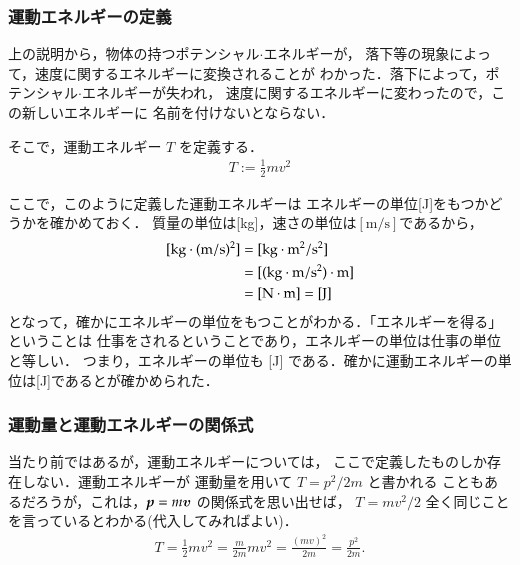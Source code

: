             \subsubsection{運動エネルギーの定義}
                上の説明から，物体の持つポテンシャル$\cdot$エネルギーが，
                落下等の現象によって，速度に関するエネルギーに変換されることが
                わかった．落下によって，ポテンシャル$\cdot$エネルギーが失われ，
                速度に関するエネルギーに変わったので，この新しいエネルギーに
                名前を付けないとならない．

                そこで，運動エネルギー $T$ を定義する．
                    \begin{align}
                        T :=  \frac{1}{2} m {\textit{v}^{2}}
                    \end{align}

                ここで，このように定義した運動エネルギーは
                エネルギーの単位[J]をもつかどうかを確かめておく．
                質量の単位は[kg]，速さの単位は$\mathrm{[m/s]}$であるから，
                    \begin{align}
                        \mathrm{ [kg\cdot (m/s)^{2}]} &= \mathrm{[kg\cdot m^{2}/s^{2}]      } \notag \\
                                                      &= \mathrm{[(kg\cdot m/s^{2})\cdot m] } \notag \\
                                                      &= \mathrm{[N\cdot m]=[J]             }
                    \end{align}
                となって，確かにエネルギーの単位をもつことがわかる．「エネルギーを得る」ということは
                仕事をされるということであり，エネルギーの単位は仕事の単位と等しい．
                つまり，エネルギーの単位も [J] である．確かに運動エネルギーの単位は[J]であるとが確かめられた．

            \subsubsection{運動量と運動エネルギーの関係式}
                当たり前ではあるが，運動エネルギーについては，
                ここで定義したものしか存在しない．運動エネルギーが
                運動量を用いて $T=p^{2}/2m$ と書かれる
                こともあるだろうが，これは，$\textit{\textbf{p}}=m\boldsymbol{v}$ の関係式を思い出せば，
                $T=mv^{2}/2$ 全く同じことを言っているとわかる(代入してみればよい)．
                    \begin{align}
                        T=\frac{1}{2}mv^{2}=\frac{m}{2m}mv^{2}=\frac{(mv)^{2}}{2m}=\frac{p^{2}}{2m}.
                    \end{align}

